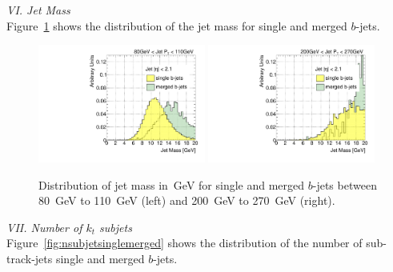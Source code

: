 
{ \em VI. Jet Mass}
\\[3mm]

Figure~\ref{fig:masssinglemerged} shows the distribution of the jet mass for single and merged $b$-jets.
\\[3mm]

\begin{figure}[tp]
\centering
\includegraphics[width=0.49\textwidth]{FIGS/VarsSingleMerged/JetMass080.pdf}
\includegraphics[width=0.49\textwidth]{FIGS/VarsSingleMerged/JetMass200.pdf}
\caption{Distribution of jet mass in~GeV for single and merged $b$-jets between 80~GeV to 110~GeV (left) and 200~GeV to 270~GeV (right).}
\label{fig:masssinglemerged}
\end{figure}

{ \em VII. Number of $k_t$ subjets}
\\[3mm]

Figure~\ref{fig:nsubjetsinglemerged} shows the distribution of the number of sub-track-jets single and merged $b$-jets.
\\[3mm]


